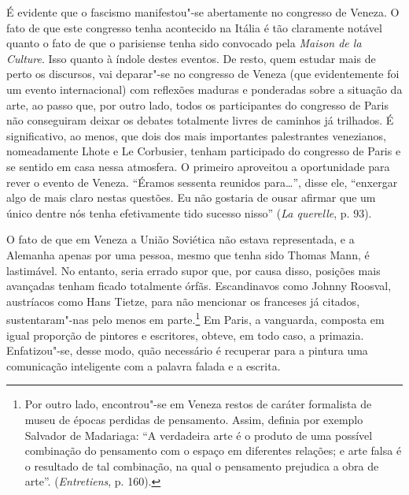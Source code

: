 É evidente que o fascismo manifestou"-se abertamente no congresso de
Veneza. O fato de que este congresso tenha acontecido na Itália é tão
claramente notável quanto o fato de que o parisiense tenha
sido convocado pela \emph{Maison de la Culture}. Isso quanto à índole
destes eventos. De resto, quem estudar mais de perto os
discursos, vai deparar"-se no congresso de Veneza (que evidentemente foi um
evento internacional) com reflexões maduras e ponderadas sobre a
situação da arte, ao passo que, por outro lado, todos
os participantes do congresso de Paris não conseguiram deixar os
debates totalmente livres de caminhos já trilhados. É significativo, ao
menos, que dois dos mais importantes palestrantes venezianos, nomeadamente Lhote e Le Corbusier, tenham
participado do congresso de Paris e se sentido em casa nessa atmosfera.
O primeiro aproveitou a oportunidade para
rever o evento de Veneza. ``Éramos sessenta reunidos
para\ldots{}'', disse ele, ``enxergar algo de mais claro nestas questões.
Eu não gostaria de ousar afirmar que um único dentre nós tenha
efetivamente tido sucesso nisso'' (\emph{La querelle}, p. 93).

O fato de que em Veneza a União Soviética não estava representada, e a
Alemanha apenas por uma pessoa, mesmo que tenha sido Thomas Mann, é
lastimável. No entanto, seria errado supor que, por causa disso,
posições mais avançadas tenham ficado totalmente órfãs. Escandinavos
como Johnny Roosval, austríacos como Hans Tietze, para não mencionar os
franceses já citados, sustentaram"-nas pelo menos em parte.\footnote{Por
  outro lado, encontrou"-se em Veneza restos de caráter formalista de
  museu de épocas perdidas de pensamento. Assim, definia por exemplo
  Salvador de Madariaga: ``A verdadeira arte é o produto de uma possível
  combinação do pensamento com o espaço em diferentes relações; e arte
  falsa é o resultado de tal combinação, na qual o pensamento prejudica
  a obra de arte''. (\emph{Entretiens}, p. 160).} Em Paris, a vanguarda, composta
em igual proporção de pintores e escritores,
obteve, em todo caso, a primazia. Enfatizou"-se, desse modo, quão
necessário é recuperar para a pintura uma comunicação inteligente com a
palavra falada e a escrita.

